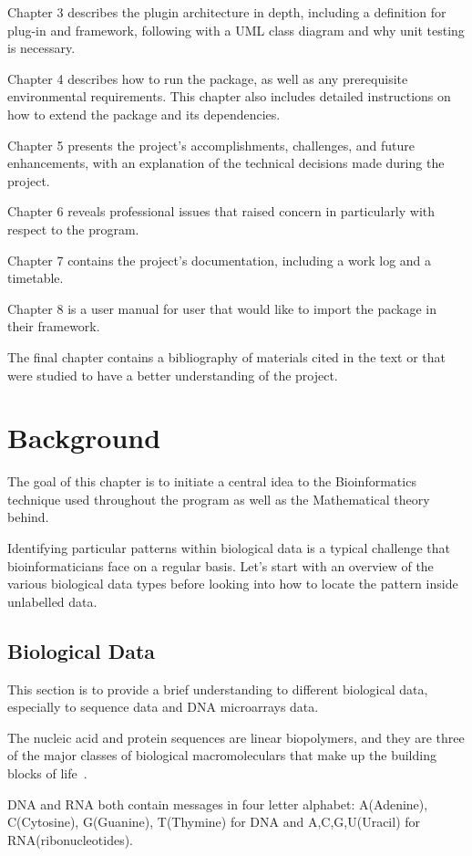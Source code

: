 \documentclass[]{final_report}
\begin{document}
Chapter 3 describes the plugin architecture in depth, including a definition for plug-in and framework, following with a UML class diagram and why unit testing is necessary.

Chapter 4 describes how to run the package, as well as any prerequisite environmental requirements. This chapter also includes detailed instructions on how to extend the package and its dependencies.

Chapter 5 presents the project's accomplishments, challenges, and future enhancements, with an explanation of the technical decisions made during the project.

Chapter 6 reveals professional issues that raised concern in particularly with respect to the program.

Chapter 7 contains the project's documentation, including a work log and a timetable.

Chapter 8 is a user manual for user that would like to import the package in their framework.

The final chapter contains a bibliography of materials cited in the text or that were studied to have a better understanding of the project.

\chapter{Background}
The goal of this chapter is to initiate a central idea to the Bioinformatics technique used throughout the program as well as the Mathematical theory behind.

Identifying particular patterns within biological data is a typical challenge that bioinformaticians face on a regular basis. Let's start with an overview of the various biological data types before looking into how to locate the pattern inside unlabelled data.

\section{Biological Data} \label{1.2}
This section is to provide a brief understanding to different biological data, especially to sequence data and DNA microarrays data.

The nucleic acid and protein sequences are linear biopolymers, and they are three of the major classes of biological macromoleculars that make up the building blocks of life~\cite{lu2011handbook}.

DNA and RNA both contain messages in four letter alphabet: A(Adenine), C(Cytosine), G(Guanine), T(Thymine) for DNA and A,C,G,U(Uracil) for RNA(ribonucleotides).  
\end{document}
